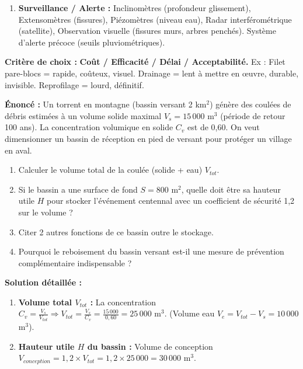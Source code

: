 \documentclass[11pt]{article}
\begin{document}
\begin{methode}
\begin{enumerate}
\begin{center}
\begin{tabularx}{\linewidth}{|l|X|X|}
            \end{tabularx}
        \end{center}
        \item \textbf{Surveillance / Alerte :} Inclinomètres (profondeur glissement), Extensomètres (fissures), Piézomètres (niveau eau), Radar interférométrique (satellite), Observation visuelle (fissures murs, arbres penchés). Système d'alerte précoce (seuils pluviométriques).
    \end{enumerate}
    \textbf{Critère de choix :} \textbf{Coût / Efficacité / Délai / Acceptabilité.} Ex : Filet pare-blocs = rapide, coûteux, visuel. Drainage = lent à mettre en œuvre, durable, invisible. Reprofilage = lourd, définitif.
\end{methode}

\begin{exoresolu}
    \textbf{Énoncé :} Un torrent en montagne (bassin versant 2 km$^2$) génère des coulées de débris estimées à un volume solide maximal $V_s = 15\,000$ m$^3$ (période de retour 100 ans). La concentration volumique en solide $C_v$ est de 0,60. On veut dimensionner un bassin de réception en pied de versant pour protéger un village en aval.
    \begin{enumerate}
        \item Calculer le volume total de la coulée (solide + eau) $V_{tot}$.
        \item Si le bassin a une surface de fond $S = 800$ m$^2$, quelle doit être sa hauteur utile $H$ pour stocker l'événement centennal avec un coefficient de sécurité 1,2 sur le volume ?
        \item Citer 2 autres fonctions de ce bassin outre le stockage.
        \item Pourquoi le reboisement du bassin versant est-il une mesure de prévention complémentaire indispensable ?
    \end{enumerate}
    \tcblower
    \textbf{Solution détaillée :}
    \begin{enumerate}
        \item \textbf{Volume total $V_{tot}$ :}
            La concentration $C_v = \frac{V_s}{V_{tot}} \Rightarrow V_{tot} = \frac{V_s}{C_v} = \frac{15\,000}{0,60} = 25\,000 \text{ m}^3$.
            (Volume eau $V_e = V_{tot} - V_s = 10\,000$ m$^3$).
        \item \textbf{Hauteur utile $H$ du bassin :}
            Volume de conception $V_{conception} = 1,2 \times V_{tot} = 1,2 \times 25\,000 = 30\,000 \text{ m}^3$.

\end{enumerate}
\end{exoresolu}
\end{document}
